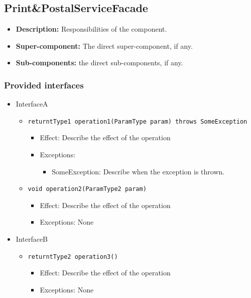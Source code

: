 \documentclass[a4paper,10pt]{article}
\begin{document}
\subsection{Print\&PostalServiceFacade}
\begin{itemize}
    \item \textbf{Description:} Responsibilities of the component.
    \item \textbf{Super-component:} The direct super-component, if any.
    \item \textbf{Sub-components:} the direct sub-components, if any.
\end{itemize}

\subsubsection*{Provided interfaces}
\begin{itemize}
    \item InterfaceA
    \begin{itemize}
        \item \texttt{returntType1 operation1(ParamType param) throws SomeException}
        \begin{itemize}
            \item Effect: Describe the effect of the operation
            \item Exceptions:
            \begin{itemize}
                \item SomeException: Describe when the exception is thrown.
            \end{itemize}
		\end{itemize}
		
        \item \texttt{void operation2(ParamType2 param)}
        \begin{itemize}
            \item Effect: Describe the effect of the operation
            \item Exceptions: None
        \end{itemize}
    \end{itemize}

    \item InterfaceB
    \begin{itemize}
        \item \texttt{returntType2 operation3()}
        \begin{itemize}
            \item Effect: Describe the effect of the operation
            \item Exceptions: None
        \end{itemize}
    \end{itemize}
\end{itemize}
\end{document}

